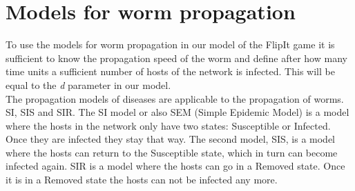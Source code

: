 \begin{description}
\end{description}

 

\section{Models for worm propagation}
\label{modelsforpropagation}
To use the models for worm propagation in our model of the FlipIt game it is sufficient to know the propagation speed of the worm and define after how many time units a sufficient number of hosts of the network is infected. This will be equal to the \textit{d} parameter in our model. \\



The propagation models of diseases are applicable to the propagation of worms. SI, SIS and SIR. The SI model or also SEM (Simple Epidemic Model) is a model where the hosts in the network only have two states: Susceptible or Infected. Once they are infected they stay that way. The second model, SIS, is a model where the hosts can return to the Susceptible state, which in turn can become infected again. SIR is a model where the hosts can go in a Removed state. Once it is in a Removed state the hosts can not be infected any more. \\


